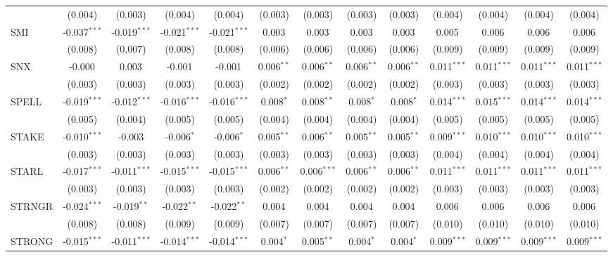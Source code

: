\begin{table}[!htbp]
\begin{tabular}{@{\extracolsep{5pt}}lcccccccccccc}
  & (0.004) & (0.003) & (0.004) & (0.004) & (0.003) & (0.003) & (0.003) & (0.003) & (0.004) & (0.004) & (0.004) & (0.004) \\
 SMI & -0.037$^{***}$ & -0.019$^{***}$ & -0.021$^{***}$ & -0.021$^{***}$ & 0.003$^{}$ & 0.003$^{}$ & 0.003$^{}$ & 0.003$^{}$ & 0.005$^{}$ & 0.006$^{}$ & 0.006$^{}$ & 0.006$^{}$ \\
  & (0.008) & (0.007) & (0.008) & (0.008) & (0.006) & (0.006) & (0.006) & (0.006) & (0.009) & (0.009) & (0.009) & (0.009) \\
 SNX & -0.000$^{}$ & 0.003$^{}$ & -0.001$^{}$ & -0.001$^{}$ & 0.006$^{**}$ & 0.006$^{**}$ & 0.006$^{**}$ & 0.006$^{**}$ & 0.011$^{***}$ & 0.011$^{***}$ & 0.011$^{***}$ & 0.011$^{***}$ \\
  & (0.003) & (0.003) & (0.003) & (0.003) & (0.002) & (0.002) & (0.002) & (0.002) & (0.003) & (0.003) & (0.003) & (0.003) \\
 SPELL & -0.019$^{***}$ & -0.012$^{***}$ & -0.016$^{***}$ & -0.016$^{***}$ & 0.008$^{*}$ & 0.008$^{**}$ & 0.008$^{*}$ & 0.008$^{*}$ & 0.014$^{***}$ & 0.015$^{***}$ & 0.014$^{***}$ & 0.014$^{***}$ \\
  & (0.005) & (0.004) & (0.005) & (0.005) & (0.004) & (0.004) & (0.004) & (0.004) & (0.005) & (0.005) & (0.005) & (0.005) \\
 STAKE & -0.010$^{***}$ & -0.003$^{}$ & -0.006$^{*}$ & -0.006$^{*}$ & 0.005$^{**}$ & 0.006$^{**}$ & 0.005$^{**}$ & 0.005$^{**}$ & 0.009$^{***}$ & 0.010$^{***}$ & 0.010$^{***}$ & 0.010$^{***}$ \\
  & (0.003) & (0.003) & (0.003) & (0.003) & (0.003) & (0.003) & (0.003) & (0.003) & (0.004) & (0.004) & (0.004) & (0.004) \\
 STARL & -0.017$^{***}$ & -0.011$^{***}$ & -0.015$^{***}$ & -0.015$^{***}$ & 0.006$^{**}$ & 0.006$^{***}$ & 0.006$^{**}$ & 0.006$^{**}$ & 0.011$^{***}$ & 0.011$^{***}$ & 0.011$^{***}$ & 0.011$^{***}$ \\
  & (0.003) & (0.003) & (0.003) & (0.003) & (0.002) & (0.002) & (0.002) & (0.002) & (0.003) & (0.003) & (0.003) & (0.003) \\
 STRNGR & -0.024$^{***}$ & -0.019$^{**}$ & -0.022$^{**}$ & -0.022$^{**}$ & 0.004$^{}$ & 0.004$^{}$ & 0.004$^{}$ & 0.004$^{}$ & 0.006$^{}$ & 0.006$^{}$ & 0.006$^{}$ & 0.006$^{}$ \\
  & (0.008) & (0.008) & (0.009) & (0.009) & (0.007) & (0.007) & (0.007) & (0.007) & (0.010) & (0.010) & (0.010) & (0.010) \\
 STRONG & -0.015$^{***}$ & -0.011$^{***}$ & -0.014$^{***}$ & -0.014$^{***}$ & 0.004$^{*}$ & 0.005$^{**}$ & 0.004$^{*}$ & 0.004$^{*}$ & 0.009$^{***}$ & 0.009$^{***}$ & 0.009$^{***}$ & 0.009$^{***}$ \\

\end{tabular}
\end{table}
